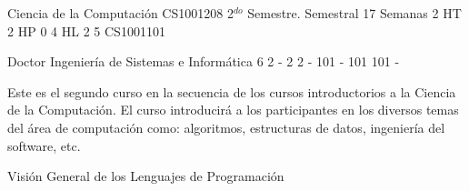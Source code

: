 \documentclass[a4paper,8pt]{article}
\begin{document}
\setNombreProfesor{}
\setGradoProfesorAbreviado{}
\sylabusHeader

\academicaTable
{Ciencia de la Computación} %
{CS1001208} %
{2$^{do}$ Semestre.} %
{Semestral} %
{17 Semanas} %
{2 HT} %
{2 HP} %
{0} %
{4 HL}  %
{2} %
{5} %
{CS1001101} %

\administrativaTable
{Doctor} %
{Ingeniería de Sistemas e Informática} %
{6} %
{2} %
{-} %
{2} %
{2} %
{-} %
{101} %
{-} %
{101} %
{101} %
{-} %


\begin{fundamentacion}
Este es el segundo curso en la secuencia de los cursos introductorios a la Ciencia de la Computación.
El curso introducirá a los participantes en los diversos temas del área de computación como: algoritmos, estructuras de datos, ingeniería del software, etc.

\end{fundamentacion}

\begin{sumilla}
\item Visión General de los Lenguajes de Programación
\item \OSVirtualMachines
\item \PLBasicTypeSystems
\item \SDFFundamentalProgrammingConcepts
\item \PLObjectOrientedProgramming
\item \SDFAlgorithmsandDesign
\item \ALAlgorithmicStrategies
\item \ALBasicAnalysis
\item \ALFundamentalDataStructuresandAlgorithms

\end{sumilla}

\begin{competenciasAsignatura}
\item {}
\item {}
\item {}
\item {}

\end{competenciasAsignatura}
\end{document}
